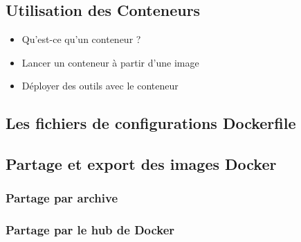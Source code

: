 \documentclass{beamer}
\begin{document}
    \subsection{Utilisation des Conteneurs}
    \begin{frame}
       \begin{itemize}
          \item{Qu'est-ce qu'un conteneur ?}
          \item{Lancer un conteneur à partir d'une image}
          \item{Déployer des outils avec le conteneur}
       \end{itemize}
       \begin{exampleblock}{}
          \em{}
       \end{exampleblock}
    \end{frame}

    \subsection{Les fichiers de configurations Dockerfile}

    \subsection{Partage et export des images Docker}
    \subsubsection{Partage par archive}
    \subsubsection{Partage par le hub de Docker}



\end{document}
